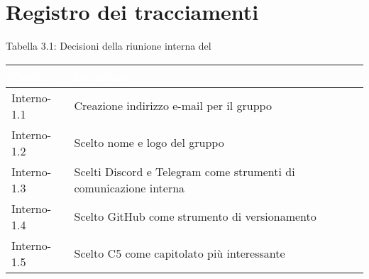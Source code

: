 \section{Registro dei tracciamenti}
{
Tabella 3.1: Decisioni della riunione interna del \Data{}
\renewcommand{\arraystretch}{1.5}
\centering
\begin{longtable}{C{3cm} C{9cm}}
\textcolor{white}{\textbf{Codice}}&
\textcolor{white}{\textbf{Decisione}}\\	
\endhead
		
Interno-1.1 & Creazione indirizzo e-mail per il gruppo\\

Interno-1.2 & Scelto nome e logo del gruppo\\

Interno-1.3 & Scelti Discord e Telegram come strumenti di comunicazione interna\\

Interno-1.4 & Scelto GitHub come strumento di versionamento\\

Interno-1.5 & Scelto C5 come capitolato più interessante\\
		
\end{longtable}
}
